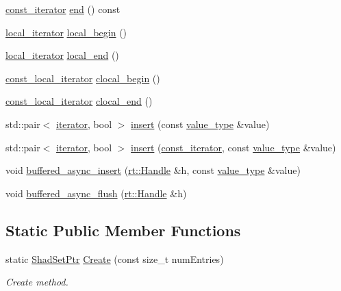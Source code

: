 \begin{DoxyCompactItemize}
\item 
\hyperlink{classshad_1_1Set_a0b2608f92f5397a25e62fad925fc177e}{const\-\_\-iterator} \hyperlink{classshad_1_1Set_ac675b386665585dbc86667ea93d1be34}{end} () const 
\item 
\hyperlink{classshad_1_1Set_a531920d32511b8fa5ffef94b0d772e29}{local\-\_\-iterator} \hyperlink{classshad_1_1Set_a179918a1cbc5793a1522a00497495eeb}{local\-\_\-begin} ()
\item 
\hyperlink{classshad_1_1Set_a531920d32511b8fa5ffef94b0d772e29}{local\-\_\-iterator} \hyperlink{classshad_1_1Set_a274bae1a1e053109f42c8864bbc707e5}{local\-\_\-end} ()
\item 
\hyperlink{classshad_1_1Set_a0857d9ce7a249e860e3a67bc18f7de8b}{const\-\_\-local\-\_\-iterator} \hyperlink{classshad_1_1Set_af16201940dce366a4865b813031e8430}{clocal\-\_\-begin} ()
\item 
\hyperlink{classshad_1_1Set_a0857d9ce7a249e860e3a67bc18f7de8b}{const\-\_\-local\-\_\-iterator} \hyperlink{classshad_1_1Set_a9a4e1a99d244de6930a3e785fd2aedf3}{clocal\-\_\-end} ()
\item 
std\-::pair$<$ \hyperlink{classshad_1_1Set_a01298773ecde90c0df1e444429bf9703}{iterator}, bool $>$ \hyperlink{classshad_1_1Set_aa6d109d2d82561a6561cd0a2c134f9f7}{insert} (const \hyperlink{classshad_1_1Set_a20c26f02edb7c6c978a0e0b6f2b46c80}{value\-\_\-type} \&value)
\item 
std\-::pair$<$ \hyperlink{classshad_1_1Set_a01298773ecde90c0df1e444429bf9703}{iterator}, bool $>$ \hyperlink{classshad_1_1Set_ac340c155ad269e57da33056acb6f39db}{insert} (\hyperlink{classshad_1_1Set_a0b2608f92f5397a25e62fad925fc177e}{const\-\_\-iterator}, const \hyperlink{classshad_1_1Set_a20c26f02edb7c6c978a0e0b6f2b46c80}{value\-\_\-type} \&value)
\item 
void \hyperlink{classshad_1_1Set_a67affb4764bef8776b12992cd304f007}{buffered\-\_\-async\-\_\-insert} (\hyperlink{classshad_1_1rt_1_1Handle}{rt\-::\-Handle} \&h, const \hyperlink{classshad_1_1Set_a20c26f02edb7c6c978a0e0b6f2b46c80}{value\-\_\-type} \&value)
\item 
void \hyperlink{classshad_1_1Set_a0ffd32ad7071950050b9119918459466}{buffered\-\_\-async\-\_\-flush} (\hyperlink{classshad_1_1rt_1_1Handle}{rt\-::\-Handle} \&h)
\end{DoxyCompactItemize}
\subsection*{Static Public Member Functions}
\begin{DoxyCompactItemize}
\item 
static \hyperlink{classshad_1_1Set_aa35015620563a346ef29432143fe1f44}{Shad\-Set\-Ptr} \hyperlink{classshad_1_1Set_a76419e199e1eb0b704f37bb4e5e107c9}{Create} (const size\-\_\-t num\-Entries)
\begin{DoxyCompactList}\small\item\em Create method. \end{DoxyCompactList}\end{DoxyCompactItemize}
